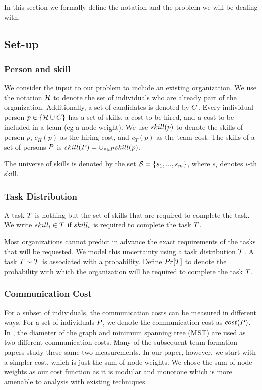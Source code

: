 In this section we formally define the notation and the problem we will be dealing with.
\subsection{Set-up}

\subsubsection{Person and skill}

We consider the input to our problem to include an existing organization.
We use the notation $\mathcal{H}$ to denote the set of individuals who are already part of the organization.
Additionally, a set of candidates is denoted by ${C}$.
Every individual person $p \in \{\mathcal{H} \cup {C}\}$ has a set of skills, a cost to be hired, and a cost to be included in a team (eg a node weight).
We use $skill(p)$ to denote the skills of person $p$, $c_H(p)$ as the hiring cost, and $c_T(p)$ as the team cost.
The skills of a set of persons $P$ is $skill(P) = \cup_{p \in P} skill(p)$.

The universe of skills is denoted by the set $\mathcal{S} = \{ s_1, ..., s_m \}$, where $s_i$ denotes $i$-th skill.

\subsubsection{Task Distribution}

A task $T$ is nothing but the set of skills that are required to complete the task.
We write $skill_i \in T$ if $skill_i$ is required to complete the task $T$.

Most organizations cannot predict in advance the exact requirements of the tasks that will be requested.
We model this uncertainty using a task distribution $\mathcal{T}$. 
A task $T \sim \mathcal{T}$ is associated with a probability.
Define $Pr[T]$ to denote the probability with which the organization will be required to complete the task $T$. 


\subsubsection{Communication Cost}
For a subset of individuals, the communication costs can be measured in different ways. 
For a set of individuals $P$, we denote the communication cost as $cost(P)$. 
In \cite{lappas2009finding}, the diameter of the graph and minimum spanning tree (MST) are used as two different communication costs.
Many of the subsequent team formation papers study these same two measurements.
In our paper, however, we start with a simpler cost, which is just the sum of node weights. We chose the sum of node weights as our cost function as it is modular and monotone which is more amenable to analysis with existing techniques. 

